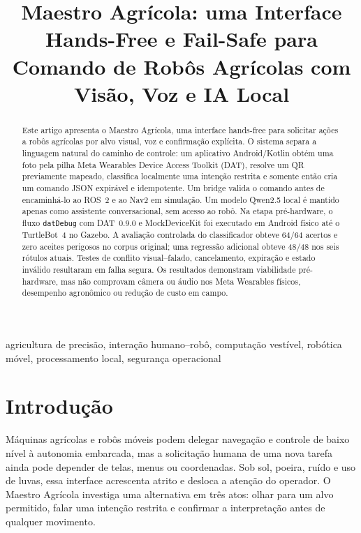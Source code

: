 \documentclass[conference]{IEEEtran}
\title{Maestro Agrícola: uma Interface Hands-Free e Fail-Safe para Comando de Robôs Agrícolas com Visão, Voz e IA Local}
\author{
\IEEEauthorblockN{Átila Capozzoli Ribeiro Rodrigues, Felipe Gonçalves Vidal e Rafael José de Souza Marques}
\IEEEauthorblockA{Equipe AgroTurtles\\
Programa AI Glasses Brasil 2026, Brasil}
}
\begin{document}
\maketitle

\begin{abstract}
Este artigo apresenta o Maestro Agrícola, uma interface hands-free para solicitar ações a robôs agrícolas por alvo visual, voz e confirmação explícita. O sistema separa a linguagem natural do caminho de controle: um aplicativo Android/Kotlin obtém uma foto pela pilha Meta Wearables Device Access Toolkit (DAT), resolve um QR previamente mapeado, classifica localmente uma intenção restrita e somente então cria um comando JSON expirável e idempotente. Um bridge valida o comando antes de encaminhá-lo ao ROS~2 e ao Nav2 em simulação. Um modelo Qwen2.5 local é mantido apenas como assistente conversacional, sem acesso ao robô. Na etapa pré-hardware, o fluxo \texttt{datDebug} com DAT~0.9.0 e MockDeviceKit foi executado em Android físico até o TurtleBot~4 no Gazebo. A avaliação controlada do classificador obteve 64/64 acertos e zero aceites perigosos no corpus original; uma regressão adicional obteve 48/48 nos seis rótulos atuais. Testes de conflito visual--falado, cancelamento, expiração e estado inválido resultaram em falha segura. Os resultados demonstram viabilidade pré-hardware, mas não comprovam câmera ou áudio nos Meta Wearables físicos, desempenho agronômico ou redução de custo em campo.
\end{abstract}

\begin{IEEEkeywords}
agricultura de precisão, interação humano--robô, computação vestível, robótica móvel, processamento local, segurança operacional
\end{IEEEkeywords}

\section{Introdução}

Máquinas agrícolas e robôs móveis podem delegar navegação e controle de baixo nível à autonomia embarcada, mas a solicitação humana de uma nova tarefa ainda pode depender de telas, menus ou coordenadas. Sob sol, poeira, ruído e uso de luvas, essa interface acrescenta atrito e desloca a atenção do operador. O Maestro Agrícola investiga uma alternativa em três atos: olhar para um alvo permitido, falar uma intenção restrita e confirmar a interpretação antes de qualquer movimento.
\end{document}
